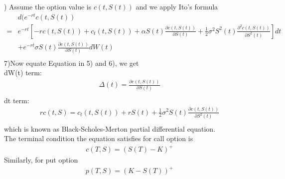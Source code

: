 \documentclass[a4paper]{article}
\begin{document}
) Assume the option value is $c(t,S(t))$ and we apply Ito's formula\\
\begin{align*}
	& d(e^{-rt } c(t, S(t)) \\
= & e^{-rt} [- r c(t, S(t)) + c_t(t, S(t)) + \alpha S(t) \frac{\partial c(t, S(t))}{\partial S(t)}  +\frac{1}{2} \sigma^2 S^2(t) \frac{\partial^2 c(t, S(t))}{\partial S^2(t)} ] dt\\
  & +e^{-rt} \sigma S(t)  \frac{\partial c(t, S(t))}{\partial S(t)} dW(t)\\
\end{align*}
7)\noindent	Now equate Equation in 5) and 6), we get\\
dW(t) term:
\begin{align*}
	\Delta(t) = \frac{\partial c(t,S(t))}{\partial S(t)} \\	
\end{align*}
dt term:
\begin{align*}
	rc(t, S)  = c_t (t, S(t)) + r S(t) + \frac{1}{2} \sigma^2 S(t) \frac{\partial c(t, S(t))}{\partial S^2(t)}  \\
\end{align*}
which is known as Black-Scholes-Merton partial differential equation.\\
The terminal condition the equation satisfies for call option is
\begin{align*}
	c(T,S) = (S(T)-K)^+
\end{align*}
Similarly, for put option
\begin{align*}
	p(T,S) = (K-S(T))^+
\end{align*}
\end{document}
